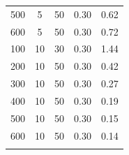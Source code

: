 \begin{table}[!h]
{\begin{tabular}{c |c| c| c| c}
500&                          5&                            50&                           0.30&                         0.62\\
600&                          5&                            50&                           0.30&                         0.72\\
100&                          10&                           30&                           0.30&                         1.44\\
200&                          10&                           50&                           0.30&                         0.42\\
300&                          10&                           50&                           0.30&                         0.27\\
400&                          10&                           50&                           0.30&                         0.19\\
500&                          10&                           50&                           0.30&                         0.15\\
600&                          10&                           50&                           0.30&                         0.14\\ 
\bottomrule
\multicolumn{5}{c}{} \\
\end{tabular}}
\end{table}

